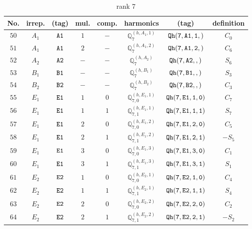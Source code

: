\documentclass[fleqn,8pt]{jsarticle}
\begin{document}
\begin{table}[ht!]
\begin{center}
\caption{rank 7}
\renewcommand{\arraystretch}{1.3}
\begin{tabular}{cccccccc} \hline \hline
No. & irrep. & (tag) & mul. & comp. & harmonics & (tag) & definition \\ \hline
$ 50 $ & $ A_{1} $ & $ {\tt A1} $ & $ 1 $ & $ - $ & $ \mathbb{Q}_{7}^{(h,A_{1},1)} $ & $ {\tt Qh(7,A1,1,)} $ & $ C_{0} $ \\
$ 51 $ & $ A_{1} $ & $ {\tt A1} $ & $ 2 $ & $ - $ & $ \mathbb{Q}_{7}^{(h,A_{1},2)} $ & $ {\tt Qh(7,A1,2,)} $ & $ C_{6} $ \\
$ 52 $ & $ A_{2} $ & $ {\tt A2} $ & $ - $ & $ - $ & $ \mathbb{Q}_{7}^{(h,A_{2})} $ & $ {\tt Qh(7,A2,,)} $ & $ S_{6} $ \\
$ 53 $ & $ B_{1} $ & $ {\tt B1} $ & $ - $ & $ - $ & $ \mathbb{Q}_{7}^{(h,B_{1})} $ & $ {\tt Qh(7,B1,,)} $ & $ S_{3} $ \\
$ 54 $ & $ B_{2} $ & $ {\tt B2} $ & $ - $ & $ - $ & $ \mathbb{Q}_{7}^{(h,B_{2})} $ & $ {\tt Qh(7,B2,,)} $ & $ C_{3} $ \\
$ 55 $ & $ E_{1} $ & $ {\tt E1} $ & $ 1 $ & $ 0 $ & $ \mathbb{Q}_{7,0}^{(h,E_{1},1)} $ & $ {\tt Qh(7,E1,1,0)} $ & $ C_{7} $ \\
$ 56 $ & $ E_{1} $ & $ {\tt E1} $ & $ 1 $ & $ 1 $ & $ \mathbb{Q}_{7,1}^{(h,E_{1},1)} $ & $ {\tt Qh(7,E1,1,1)} $ & $ S_{7} $ \\
$ 57 $ & $ E_{1} $ & $ {\tt E1} $ & $ 2 $ & $ 0 $ & $ \mathbb{Q}_{7,0}^{(h,E_{1},2)} $ & $ {\tt Qh(7,E1,2,0)} $ & $ C_{5} $ \\
$ 58 $ & $ E_{1} $ & $ {\tt E1} $ & $ 2 $ & $ 1 $ & $ \mathbb{Q}_{7,1}^{(h,E_{1},2)} $ & $ {\tt Qh(7,E1,2,1)} $ & $ - S_{5} $ \\
$ 59 $ & $ E_{1} $ & $ {\tt E1} $ & $ 3 $ & $ 0 $ & $ \mathbb{Q}_{7,0}^{(h,E_{1},3)} $ & $ {\tt Qh(7,E1,3,0)} $ & $ C_{1} $ \\
$ 60 $ & $ E_{1} $ & $ {\tt E1} $ & $ 3 $ & $ 1 $ & $ \mathbb{Q}_{7,1}^{(h,E_{1},3)} $ & $ {\tt Qh(7,E1,3,1)} $ & $ S_{1} $ \\
$ 61 $ & $ E_{2} $ & $ {\tt E2} $ & $ 1 $ & $ 0 $ & $ \mathbb{Q}_{7,0}^{(h,E_{2},1)} $ & $ {\tt Qh(7,E2,1,0)} $ & $ C_{4} $ \\
$ 62 $ & $ E_{2} $ & $ {\tt E2} $ & $ 1 $ & $ 1 $ & $ \mathbb{Q}_{7,1}^{(h,E_{2},1)} $ & $ {\tt Qh(7,E2,1,1)} $ & $ S_{4} $ \\
$ 63 $ & $ E_{2} $ & $ {\tt E2} $ & $ 2 $ & $ 0 $ & $ \mathbb{Q}_{7,0}^{(h,E_{2},2)} $ & $ {\tt Qh(7,E2,2,0)} $ & $ C_{2} $ \\
$ 64 $ & $ E_{2} $ & $ {\tt E2} $ & $ 2 $ & $ 1 $ & $ \mathbb{Q}_{7,1}^{(h,E_{2},2)} $ & $ {\tt Qh(7,E2,2,1)} $ & $ - S_{2} $ \\
 \hline \hline
\end{tabular}
\end{center}
\end{table}
\end{document}
